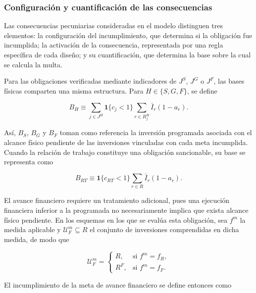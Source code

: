 \subsubsection{Configuración y cuantificación de las consecuencias}

Las consecuencias pecuniarias consideradas en el modelo distinguen tres elementos: la configuración del incumplimiento, que determina si la obligación fue incumplida; la activación de la consecuencia, representada por una regla específica de cada diseño; y su cuantificación, que determina la base sobre la cual se calcula la multa.

Para las obligaciones verificadas mediante indicadores de \(J^{S}\), \(J^{G}\) o \(J^{F}\), las bases físicas comparten una misma estructura. Para \(H\in\{S,G,F\}\), se define

\begin{equation}
\label{eq:base_fisica_generica}
B_H
\equiv
\sum_{j\in J^{H}}
\mathbf{1}\{c_j<1\}
\sum_{r\in R_j^{H}}
\bar I_r(1-a_r).
\end{equation}

Así, \(B_S\), \(B_G\) y \(B_F\) toman como referencia la inversión programada asociada con el alcance físico pendiente de las inversiones vinculadas con cada meta incumplida. Cuando la relación de trabajo constituye una obligación sancionable, su base se representa como

\begin{equation}
\label{eq:base_rt}
B_{RT}
\equiv
\mathbf{1}\{c_{RT}<1\}
\sum_{r\in R}
\bar I_r(1-a_r).
\end{equation}

El avance financiero requiere un tratamiento adicional, pues una ejecución financiera inferior a la programada no necesariamente implica que exista alcance físico pendiente. En los esquemas en los que se evalúa esta obligación, sea \(f^m\) la medida aplicable y \(\mathcal U_F^m\subseteq R\) el conjunto de inversiones comprendidas en dicha medida, de modo que

\begin{equation}
\label{eq:universo_financiero}
\mathcal U_F^m
=
\begin{cases}
R,
&
\text{si } f^m=f_R,
\\[4pt]
R^{F},
&
\text{si } f^m=f_F.
\end{cases}
\end{equation}

El incumplimiento de la meta de avance financiero se define entonces como

